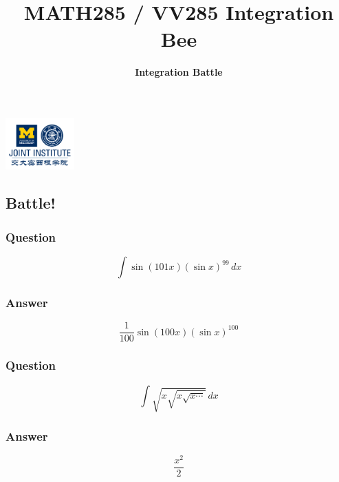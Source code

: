 \documentclass[12pt, t]{beamer}
\title{MATH285 / VV285 Integration Bee}
\subtitle{\textbf{Integration Battle}}
\institute[UM-SJTU JI]{University of Michigan-Shanghai Jiao Tong University Joint Institute}
\begin{document}
\begin{frame}
    \titlepage
    \begin{center}
        \includegraphics[height=2cm]{Figures/logo/logo2.png}
    \end{center}
\end{frame}

\subsection{Battle!}
\begin{frame}
    \frametitle{Question}
    \vfill
    \begin{Large}
        \begin{equation*}
            \int \sin(101x)(\sin x)^{99}\,dx
        \end{equation*}
    \end{Large}
    \vfill
\end{frame}

\begin{frame}
    \frametitle{Answer}
    \vfill
    \begin{Large}
        \begin{equation*}
            \frac{1}{100}\sin(100x)(\sin x)^{100}
        \end{equation*}    
    \end{Large}
    \vfill
\end{frame}

\begin{frame}
    \frametitle{Question}
    \vfill
    \begin{Large}
        \begin{equation*}
            \int \sqrt{x\sqrt{x\sqrt{x\cdots}}}\,dx
        \end{equation*}    
    \end{Large}
    \vfill
\end{frame}

\begin{frame}
    \frametitle{Answer}
    \vfill
    \begin{Large}
        \begin{equation*}
            \frac{x^2}{2}
        \end{equation*}    
    \end{Large}
    \vfill
\end{frame}
\end{document}
